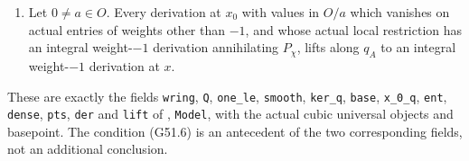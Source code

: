 \begin{theorem}
\begin{enumerate}
\item Let $0\ne a\in O$.  Every derivation at $x_0$
with values in $O/a$ which vanishes on actual entries
of weights other than $-1$, and whose actual local
restriction has an integral weight-$-1$ derivation
annihilating $P_\chi$, lifts along $q_A$ to an integral
weight-$-1$ derivation at $x$.
\end{enumerate}

These are exactly the fields
\texttt{wring}, \texttt{Q}, \texttt{one\_le},
\texttt{smooth}, \texttt{ker\_q}, \texttt{base},
\texttt{x\_0\_q}, \texttt{ent}, \texttt{dense},
\texttt{pts}, \texttt{der} and \texttt{lift} of
, \texttt{Model},
with the actual cubic universal objects and basepoint.
The condition (G51.6) is an antecedent of the two
corresponding fields, not an additional conclusion.
\end{theorem}
